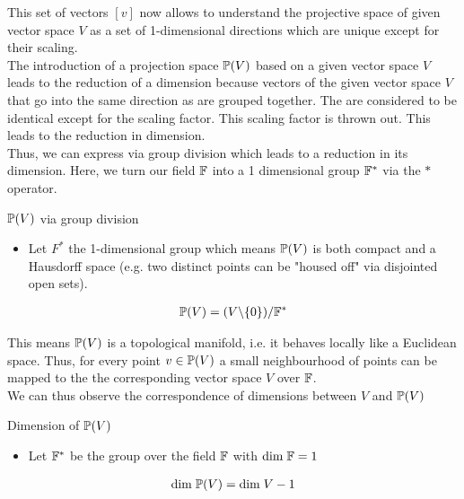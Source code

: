 This set of vectors $[v]$ now allows to understand the projective space of given vector space $V$ as a set of 1-dimensional directions which are unique except for their scaling. \\
The introduction of a projection space $\mathbb{P}(V)$ based on a given vector space $V$ leads to the reduction of a dimension because vectors of the given vector space $V$ that go into the same direction as are grouped together. The are considered to be identical except for the scaling factor. This scaling factor is thrown out. This leads to the reduction in dimension. \\
Thus, we can express via group division which leads to a reduction in its dimension. Here, we turn our field $\mathbb{F}$ into a 1 dimensional group $\mathbb{F}^*$ via the $*$ operator.

\begin{definitionBox}{$\mathbb{P}(V)$ via group division}
    \begin{itemize}
        \item Let $F^*$ the 1-dimensional group which means $\mathbb{P}(V)$ is both compact and a Hausdorff space (e.g. two distinct points can be "housed off" via disjointed open sets).
    \end{itemize}
    \begin{gather*}
        \mathbb{P}(V) = (V \backslash \{ 0 \}) /\mathbb{F}^*
    \end{gather*}
\end{definitionBox}

This means $\mathbb{P}(V)$ is a topological manifold, i.e. it behaves locally like a Euclidean space. Thus, for every point $v \in \mathbb{P}(V)$ a small neighbourhood of points can be mapped to the the corresponding vector space $V$ over $\mathbb{F}$. \\

We can thus observe the correspondence of dimensions between $V$ and $\mathbb{P}(V)$
\begin{definitionBox}{Dimension of $\mathbb{P}(V)$}
    \begin{itemize}
        \item Let $\mathbb{F}^*$ be the group over the field $\mathbb{F}$ with $\mathrm{dim}\;\mathbb{F} = 1$
    \end{itemize}
    \begin{gather*}
        \mathrm{dim}\; \mathbb{P}(V) = \mathrm{dim}\; V -1
    \end{gather*}
\end{definitionBox}




